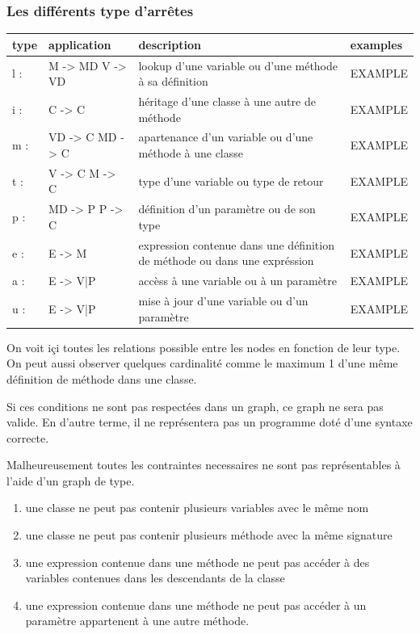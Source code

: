 \documentclass[a4paper, 10pt]{article}
\begin{document}
\subsubsection{Les différents type d'arrêtes}

  \begin{tabular}{ | l | l |  l | l |}
    \hline type & application & description & examples \\ \hline
    l : & M -> MD  V -> VD &  lookup d'une variable ou d'une méthode à sa définition & EXAMPLE \\ \hline 
    i : & C -> C &  héritage d'une classe à une autre de méthode & EXAMPLE   \\ \hline
    m : & VD -> C  MD -> C &   apartenance d'un variable ou d'une méthode à une classe & EXAMPLE   \\ \hline
    t : & V -> C  M -> C &   type d'une variable ou type de retour & EXAMPLE   \\ \hline
    p : & MD -> P  P -> C &   définition d'un paramètre ou de son type  & EXAMPLE   \\ \hline
    e : & E -> M & expression contenue dans une définition de méthode ou dans une expréssion & EXAMPLE   \\ \hline
    a : & E -> {V|P} & accèss à une variable ou à un paramètre & EXAMPLE   \\ \hline
    u : & E -> {V|P} & mise à jour d'une variable ou d'un paramètre & EXAMPLE   \\ \hline
   \end{tabular}

On voit içi toutes les relations possible entre les nodes en fonction de leur type.
On peut aussi observer quelques cardinalité comme le maximum 1 d'une même définition de méthode dans une classe.

Si ces conditions ne sont pas respectées dans un graph, ce graph ne sera pas valide. En d'autre terme, il ne représentera pas un programme doté d'une syntaxe correcte.

Malheureusement toutes les contraintes necessaires ne sont pas représentables à l'aide d'un graph de type.

\begin{enumerate}
\item une classe ne peut pas contenir plusieurs variables avec le même nom
\item une classe ne peut pas contenir plusieurs méthode avec la même signature
\item une expression contenue dans une méthode ne peut pas accéder à des variables contenues dans les descendants de la classe
\item une expression contenue dans une méthode ne peut pas accéder à un paramètre appartenent à une autre méthode.
\end{enumerate}
\end{document}
